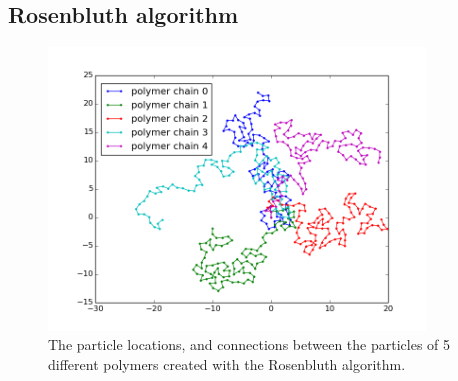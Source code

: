 \documentclass{article}
\begin{document}
\begin{multicols}{2}
\subsection*{Rosenbluth algorithm}
 \begin{figure}[ht]
\centering
\includegraphics[width=10cm]{beterepolymerenplaatje.png}
\caption{The particle locations, and connections between the particles of 5 different polymers created with the Rosenbluth algorithm.}
 \label{fig:polymers}
\end{figure} 

\end{multicols}
\end{document}
